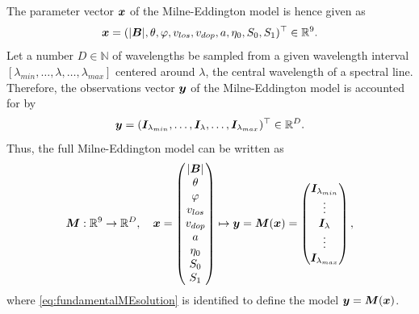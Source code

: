 \documentclass[a4paper,12pt]{report}
\begin{document}
The parameter vector $\bm{x}$ of the Milne-Eddington model is hence given as \begin{equation}
\bm{x} = (|\bm{B}|,\theta,\varphi,v_{los},v_{dop},a,\eta_0,S_0,S_1)^\top \in \mathbb{R}^9.
\end{equation} 
Let a number $D \in \mathbb{N}$ of wavelengths be sampled from a given wavelength interval $[\lambda_{min},\dots,\lambda,\dots,\lambda_{max}]$ centered around $\lambda$, the central wavelength of a spectral line. Therefore, the observations vector $\bm{y}$ of the Milne-Eddington model is accounted for by \begin{equation}
\bm{y} = (\bm{I}_{\lambda_{min}},\dots,\bm{I}_\lambda,\dots,\bm{I}_{\lambda_{max}})^\top \in \mathbb{R}^D.
\end{equation} 
Thus, the full Milne-Eddington model can be written as \begin{equation}\label{eq:ME_model_equation}
\bm{M}:\mathbb{R}^9 \rightarrow \mathbb{R}^D, \quad \bm{x} = \begin{pmatrix}
|\bm{B}| \\
\theta \\
\varphi \\
v_{los} \\
v_{dop} \\
a \\
\eta_0 \\
S_0 \\
S_1
\end{pmatrix} \mapsto \bm{y} = \bm{M}(\bm{x}) = \begin{pmatrix}
\bm{I}_{\lambda_{min}} \\
\vdots \\
\bm{I}_{\lambda} \\
\vdots \\
\bm{I}_{\lambda_{max}}
\end{pmatrix},
\end{equation}
where \cref{eq:fundamentalMEsolution} is identified to define the model $\bm{y} = \bm{M}(\bm{x})$.
\end{document}
